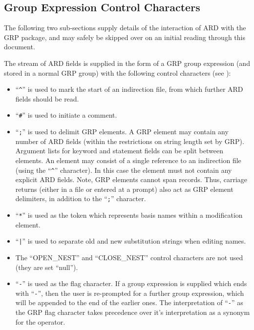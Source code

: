 \subsection{\label{SEC:GRPCC}Group Expression Control Characters}
The following two sub-sections supply details of the interaction of ARD with the
GRP package, and may safely be skipped over on an initial reading through this
document. 

The stream of ARD fields is supplied in the form of a GRP group expression (and
stored in a normal GRP group) with the following control characters (see
): 

\begin{itemize}

\item ``\verb+^+'' is used to mark the start of an indirection file, from which 
further ARD fields should be read.

\item ``\verb+#+'' is used to initiate a comment. 

\item ``\verb+;+'' is used to delimit GRP elements. A GRP element may contain 
any
number of ARD fields (within the restrictions on string length set by GRP).
Argument lists for keyword and statement fields can be split between elements.
An element may consist of a single reference to an indirection file (using the
``\verb+^+'' character). In this case the element must not contain any 
explicit ARD fields. Note, GRP elements cannot span records. Thus,
carriage returns (either in a file or entered at a prompt) also act as GRP 
element delimiters, in addition to the ``\verb+;+'' character.

\item ``\verb+*+'' is used as the token which represents basis names 
within a modification element.

\item ``\verb+|+'' is used to separate old and new substitution strings
when editing names. 

\item The ``OPEN\_NEST'' and ``CLOSE\_NEST'' control characters are not used 
(they are set ``null'').

\item ``\verb+-+'' is used as the flag character. If a group expression is
supplied which ends with ``\verb+-+'', then the user is re-prompted for a
further group expression, which will be appended to the end of the earlier ones.
The interpretation of ``\verb+-+'' as the GRP flag character takes precedence
over it's interpretation as a synonym for the  operator. 


\end{itemize}
